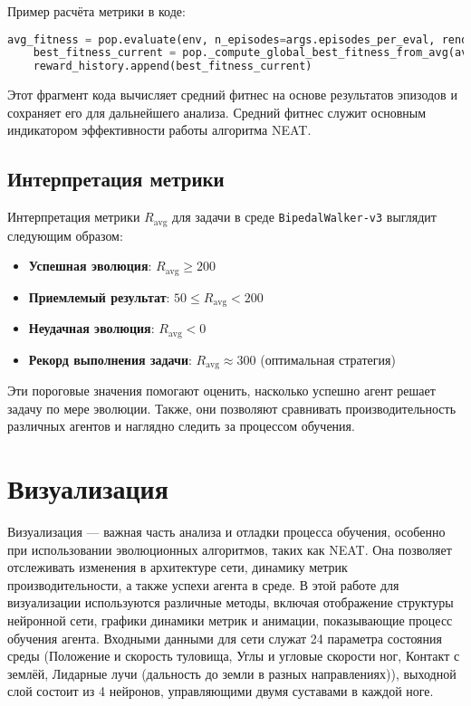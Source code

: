 \documentclass[a4paper,12pt]{article}
\begin{document}
Пример расчёта метрики в коде:

\begin{lstlisting}[language=Python]
    avg_fitness = pop.evaluate(env, n_episodes=args.episodes_per_eval, render=False)
    best_fitness_current = pop._compute_global_best_fitness_from_avg(avg_fitness)
    reward_history.append(best_fitness_current)
\end{lstlisting}

Этот фрагмент кода вычисляет средний фитнес на основе результатов эпизодов и сохраняет его для дальнейшего анализа. Средний фитнес служит основным индикатором эффективности работы алгоритма NEAT.

\subsection{Интерпретация метрики}

Интерпретация метрики $R_{\text{avg}}$ для задачи в среде \texttt{BipedalWalker-v3} выглядит следующим образом:
\begin{itemize}
    \item \textbf{Успешная эволюция}: $R_{\text{avg}} \geq 200$
    \item \textbf{Приемлемый результат}: $50 \leq R_{\text{avg}} < 200$
    \item \textbf{Неудачная эволюция}: $R_{\text{avg}} < 0$
    \item \textbf{Рекорд выполнения задачи}: $R_{\text{avg}} \approx 300$ (оптимальная стратегия)
\end{itemize}

Эти пороговые значения помогают оценить, насколько успешно агент решает задачу по мере эволюции. Также, они позволяют сравнивать производительность различных агентов и наглядно следить за процессом обучения.

\newpage
\section{Визуализация}

Визуализация — важная часть анализа и отладки процесса обучения, особенно при использовании эволюционных алгоритмов, таких как NEAT. Она позволяет отслеживать изменения в архитектуре сети, динамику метрик производительности, а также успехи агента в среде. В этой работе для визуализации используются различные методы, включая отображение структуры нейронной сети, графики динамики метрик и анимации, показывающие процесс обучения агента. Входными данными для сети служат 24 параметра состояния среды (Положение и скорость туловища, Углы и угловые скорости ног, Контакт с землёй, Лидарные лучи (дальность до земли в разных направлениях)), выходной слой состоит из 4 нейронов, управляющими двумя суставами в каждой ноге. 
\end{document}

